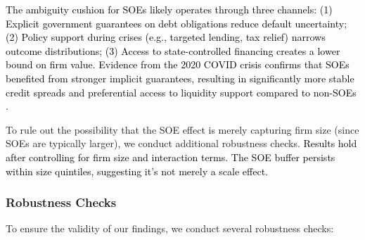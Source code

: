 \documentclass[preprint,12pt,authoryear]{elsarticle}
\begin{document}
 \textcolor{black}{The ambiguity cushion for SOEs likely operates through three channels: (1) Explicit government guarantees on debt obligations reduce default uncertainty; (2) Policy support during crises (e.g., targeted lending, tax relief) narrows outcome distributions; (3) Access to state-controlled financing creates a lower bound on firm value. Evidence from the 2020 COVID crisis confirms that SOEs benefited from stronger implicit guarantees, resulting in significantly more stable credit spreads and preferential access to liquidity support compared to non-SOEs \citep{Geng2024}.}
  
  To rule out the possibility that the SOE effect is merely capturing firm size (since SOEs are typically larger), we conduct additional robustness checks. \textcolor{black}{Results hold after controlling for firm size and interaction terms. The SOE buffer persists within size quintiles, suggesting it's not merely a scale effect.}

\subsubsection{Robustness Checks}
\label{sec:robustness}

To ensure the validity of our findings, we conduct several robustness checks:
\end{document}
